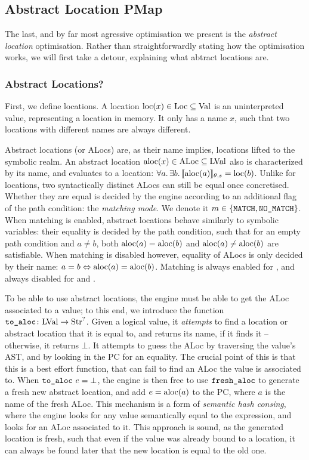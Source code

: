 \subsection{Abstract Location PMap}

The last, and by far most agressive optimisation we present is the \emph{abstract location} optimisation. Rather than straightforwardly stating how the optimisation works, we will first take a detour, explaining what abtract locations are.

\subsubsection{Abstract Locations?}

First, we define locations. A location $\text{loc}(x)\in\text{Loc}\subseteq\text{Val}$ is an uninterpreted value, representing a location in memory. It only has a name $x$, such that two locations with different names are always different.

Abstract locations (or ALocs) are, as their name implies, locations lifted to the symbolic realm. An abstract location $\text{aloc}(x)\in\text{ALoc}\subseteq\text{LVal}$ also is characterized by its name, and evaluates to a location: $\forall a\ldotp \exists b\ldotp \llbracket\text{aloc}(a)\rrbracket_{\theta,s}=\text{loc}(b)$. Unlike for locations, two syntactically distinct ALocs can still be equal once concretised. Whether they are equal is decided by the engine according to an additional flag of the path condition: the \emph{matching mode}. We denote it $m\in\{\texttt{MATCH},\texttt{NO\_MATCH}\}$. When matching is enabled, abstract locations behave similarly to symbolic variables: their equality is decided by the path condition, such that for an empty path condition and $a\neq b$, both $\text{aloc}(a)=\text{aloc}(b)$ and $\text{aloc}(a)\neq\text{aloc}(b)$ are satisfiable. When matching is disabled however, equality of ALocs is only decided by their name: $a=b\Leftrightarrow \text{aloc}(a)=\text{aloc}(b)$. Matching is always enabled for \consume, and always disabled for \produce{} and \execac.

To be able to use abstract locations, the engine must be able to get the ALoc associated to a value; to this end, we introduce the function $\texttt{to\_aloc}\colon \text{LVal}\rightarrow\text{Str}^?$. Given a logical value, it \emph{attempts} to find a location or abstract location that it is equal to, and returns its name, if it finds it -- otherwise, it returns $\bot$. It attempts to guess the ALoc by traversing the value's AST, and by looking in the PC for an equality. The crucial point of this is that this is a best effort function, that can fail to find an ALoc the value is associated to. When $\texttt{to\_aloc}~e=\bot$, the engine is then free to use $\texttt{fresh\_aloc}$ to generate a fresh new abstract location, and add $e=\text{aloc}(a)$ to the PC, where $a$ is the name of the fresh ALoc. This mechanism is a form of \emph{semantic hash consing}, where the engine looks for any value semantically equal to the expression, and looks for an ALoc associated to it. This approach is sound, as the generated location is fresh, such that even if the value was already bound to a location, it can always be found later that the new location is equal to the old one.

